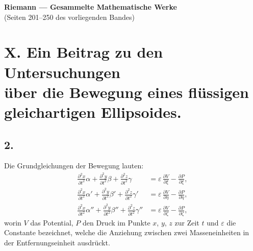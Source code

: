\documentclass[12pt,a4paper]{article}
\begin{document}
\begin{center}
{\LARGE\bfseries Riemann --- Gesammelte Mathematische Werke}\\[1em]
{\Large (Seiten 201--250 des vorliegenden Bandes)}\\[2em]
\end{center}

\tableofcontents
\newpage


\section*{X. Ein Beitrag zu den Untersuchungen \\ über die Bewegung eines flüssigen gleichartigen Ellipsoides.}

\subsection*{2.}

Die Grundgleichungen der Bewegung lauten:
\begin{equation}
\tag{1}
\begin{aligned}
\frac{\partial^2 x}{\partial t^2}\alpha + \frac{\partial^2 y}{\partial t^2}\beta + \frac{\partial^2 z}{\partial t^2}\gamma &= \varepsilon\,\frac{\partial V}{\partial \xi} - \frac{\partial P}{\partial \xi},\\
\frac{\partial^2 x}{\partial t^2}\alpha' + \frac{\partial^2 y}{\partial t^2}\beta' + \frac{\partial^2 z}{\partial t^2}\gamma' &= \varepsilon\,\frac{\partial V}{\partial \eta} - \frac{\partial P}{\partial \eta},\\
\frac{\partial^2 x}{\partial t^2}\alpha'' + \frac{\partial^2 y}{\partial t^2}\beta'' + \frac{\partial^2 z}{\partial t^2}\gamma'' &= \varepsilon\,\frac{\partial V}{\partial \zeta} - \frac{\partial P}{\partial \zeta},
\end{aligned}
\end{equation}
worin $V$ das Potential, $P$ den Druck im Punkte $x$, $y$, $z$ zur Zeit $t$ und $\varepsilon$ die Constante bezeichnet, welche die Anziehung zwischen zwei Masseneinheiten in der Entfernungseinheit ausdrückt.
\end{document}
